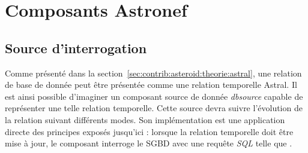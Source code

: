 \section{Composants Astronef}\label{sec:contrib:asteroid:composants}
\subsection{Source d'interrogation}
Comme présenté dans la section~\ref{sec:contrib:asteroid:theorie:astral}, une relation de base de donnée peut être présentée comme une relation temporelle Astral. Il est ainsi possible d'imaginer un composant source de donnée \textit{dbsource} capable de représenter une telle relation temporelle. Cette source devra suivre l'évolution de la relation suivant différents modes. Son implémentation est une application directe des principes exposés jusqu'ici : lorsque la relation temporelle doit être mise à jour, le composant interroge le SGBD avec une requête \textit{SQL} telle que .

